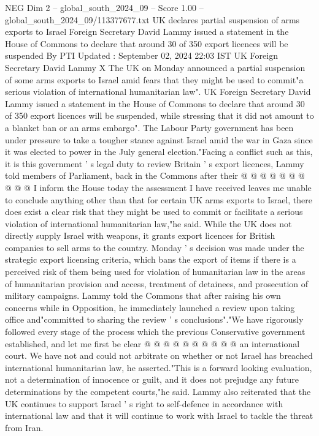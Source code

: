 \begin{textsample}{NEG Dim 2 – global\_south\_2024\_09 – Score 1.00 – global\_south\_2024\_09/113377677.txt}  \label{ex:f2_neg_413}
UK declares partial suspension of arms exports to Israel Foreign Secretary David Lammy issued a statement in the House of Commons to declare that around 30 of 350 export licences will be suspended By PTI Updated : September 02, 2024 22:03 IST UK Foreign Secretary David Lammy X The UK on Monday announced a partial suspension of some arms exports to Israel amid fears that they might be used to commit"a serious violation of international humanitarian law".
UK Foreign Secretary David Lammy issued a statement in the House of Commons to declare that around 30 of 350 export licences will be suspended, while stressing that it did not amount to a blanket ban or an arms embargo".
The Labour Party government has been under pressure to take a tougher stance against Israel amid the war in Gaza since it was elected to power in the July general election."Facing a conflict such as this, it is this government ' s legal duty to review Britain ' s export licences, Lammy told members of Parliament, back in the Commons after their @ @ @ @ @ @ @ @ @ @ I inform the House today the assessment I have received leaves me unable to conclude anything other than that for certain UK arms exports to Israel, there does exist a clear risk that they might be used to commit or facilitate a serious violation of international humanitarian law,"he said.
While the UK does not directly supply Israel with weapons, it grants export licences for British companies to sell arms to the country.
Monday ' s decision was made under the strategic export licensing criteria, which bans the export of items if there is a perceived risk of them being used for violation of humanitarian law in the areas of humanitarian provision and access, treatment of detainees, and prosecution of military campaigns.
Lammy told the Commons that after raising his own concerns while in Opposition, he immediately launched a review upon taking office and"committed to sharing the review ' s conclusions"."We have rigorously followed every stage of the process which the previous Conservative government established, and let me first be clear @ @ @ @ @ @ @ @ @ @ an international court.
We have not and could not arbitrate on whether or not Israel has breached international humanitarian law, he asserted."This is a forward looking evaluation, not a determination of innocence or guilt, and it does not prejudge any future determinations by the competent courts,"he said.
Lammy also reiterated that the UK continues to support Israel ' s right to self-defence in accordance with international law and that it will continue to work with Israel to tackle the threat from Iran.

\end{textsample}
